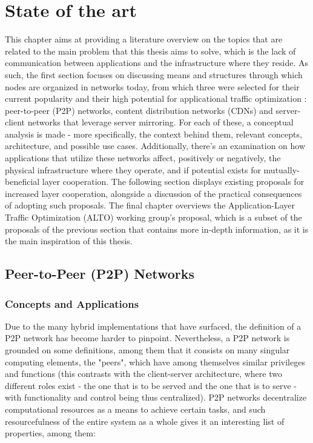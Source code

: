\documentclass[
  oneside,
  11pt, a4paper,
  footinclude=true,
  headinclude=true,
  cleardoublepage=empty
]{scrbook}
\begin{document}
	\chapter{State of the art}
	This chapter aims at providing a literature overview on the topics that are related to the main problem that this thesis aims to solve, which is the lack of communication between applications and the infrastructure where they reside. As such, the first section focuses on discussing means and structures through which nodes are organized in networks today, from which three were selected for their current popularity and their high potential for applicational traffic optimization : peer-to-peer (P2P) networks, content distribution networks (CDNs) and server-client networks that leverage server mirroring. For each of these, a conceptual analysis is made - more specifically, the context behind them, relevant concepts, architecture, and possible use cases. Additionally, there's an examination on how applications that utilize these networks affect, positively or negatively, the physical infrastructure where they operate, and if potential exists for mutually-beneficial layer cooperation. The following section displays existing proposals for increased layer cooperation, alongside a discussion of the practical consequences of adopting such proposals. The final chapter overviews the Application-Layer Traffic Optimization (ALTO) working group's proposal, which is a subset of the proposals of the previous section that contains more in-depth information, as it is the main inspiration of this thesis.  
	
	\section{Peer-to-Peer (P2P) Networks}
	
	\subsection{Concepts and Applications}
	
	Due to the many hybrid implementations that have surfaced, the definition of a P2P network has become harder to pinpoint. Nevertheless, a P2P network is grounded on some definitions, among them that it consists on many singular computing elements, the "peers", which have among themselves similar privileges and functions (this contrasts with the client-server architecture, where two different roles exist - the one that is to be served and the one that is to serve - with functionality and control being thus centralized). P2P networks decentralize computational resources as a means to achieve certain tasks, and such resourcefulness of the entire system as a whole gives it an interesting list of properties, among them:
	
\end{document}
